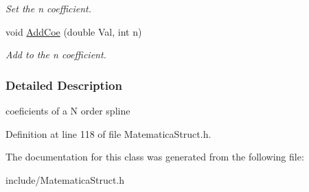 \begin{DoxyCompactItemize}
\begin{DoxyCompactList}\small\item\em Set the n coefficient. \end{DoxyCompactList}\item 
void \hyperlink{classSpline_aeda17df26c0620cbf9e634c00de774df}{Add\+Coe} (double Val, int n)\hypertarget{classSpline_aeda17df26c0620cbf9e634c00de774df}{}\label{classSpline_aeda17df26c0620cbf9e634c00de774df}

\begin{DoxyCompactList}\small\item\em Add to the n coefficient. \end{DoxyCompactList}\end{DoxyCompactItemize}


\subsubsection{Detailed Description}
coeficients of a N order spline 

Definition at line 118 of file Matematica\+Struct.\+h.



The documentation for this class was generated from the following file\+:\begin{DoxyCompactItemize}
\item 
include/Matematica\+Struct.\+h\end{DoxyCompactItemize}
